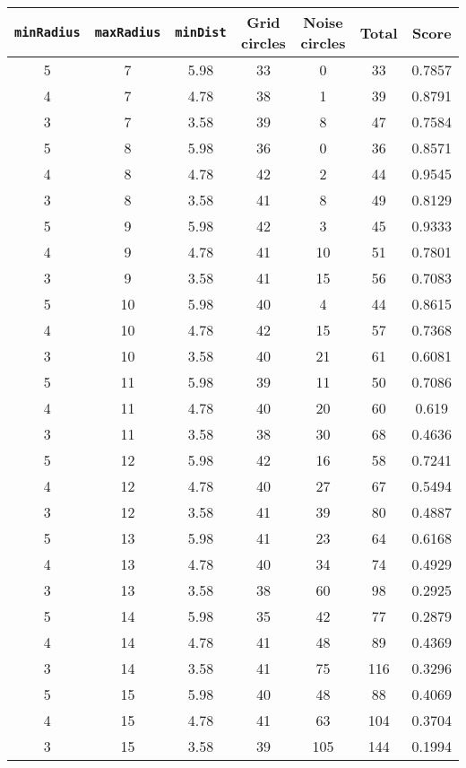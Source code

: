 \documentclass[letterpaper, 12pt]{article}
\begin{document}
\begin{longtable}{|c|c|c|c|c|c|c|}
\hline
\textbf{\texttt{minRadius}} & \textbf{\texttt{maxRadius}} & \textbf{\texttt{minDist}} & \textbf{Grid circles} & \textbf{Noise circles} & \textbf{Total} & \textbf{Score} \\
\hline
5 & 7 & 5.98 & 33 & 0 & 33 & 0.7857 \\
\hline
4 & 7 & 4.78 & 38 & 1 & 39 & 0.8791 \\
\hline
3 & 7 & 3.58 & 39 & 8 & 47 & 0.7584 \\
\hline
5 & 8 & 5.98 & 36 & 0 & 36 & 0.8571 \\
\hline
4 & 8 & 4.78 & 42 & 2 & 44 & 0.9545 \\
\hline
3 & 8 & 3.58 & 41 & 8 & 49 & 0.8129 \\
\hline
5 & 9 & 5.98 & 42 & 3 & 45 & 0.9333 \\
\hline
4 & 9 & 4.78 & 41 & 10 & 51 & 0.7801 \\
\hline
3 & 9 & 3.58 & 41 & 15 & 56 & 0.7083 \\
\hline
5 & 10 & 5.98 & 40 & 4 & 44 & 0.8615 \\
\hline
4 & 10 & 4.78 & 42 & 15 & 57 & 0.7368 \\
\hline
3 & 10 & 3.58 & 40 & 21 & 61 & 0.6081 \\
\hline
5 & 11 & 5.98 & 39 & 11 & 50 & 0.7086 \\
\hline
4 & 11 & 4.78 & 40 & 20 & 60 & 0.619 \\
\hline
3 & 11 & 3.58 & 38 & 30 & 68 & 0.4636 \\
\hline
5 & 12 & 5.98 & 42 & 16 & 58 & 0.7241 \\
\hline
4 & 12 & 4.78 & 40 & 27 & 67 & 0.5494 \\
\hline
3 & 12 & 3.58 & 41 & 39 & 80 & 0.4887 \\
\hline
5 & 13 & 5.98 & 41 & 23 & 64 & 0.6168 \\
\hline
4 & 13 & 4.78 & 40 & 34 & 74 & 0.4929 \\
\hline
3 & 13 & 3.58 & 38 & 60 & 98 & 0.2925 \\
\hline
5 & 14 & 5.98 & 35 & 42 & 77 & 0.2879 \\
\hline
4 & 14 & 4.78 & 41 & 48 & 89 & 0.4369 \\
\hline
3 & 14 & 3.58 & 41 & 75 & 116 & 0.3296 \\
\hline
5 & 15 & 5.98 & 40 & 48 & 88 & 0.4069 \\
\hline
4 & 15 & 4.78 & 41 & 63 & 104 & 0.3704 \\
\hline
3 & 15 & 3.58 & 39 & 105 & 144 & 0.1994 \\

\end{longtable}
\end{document}
